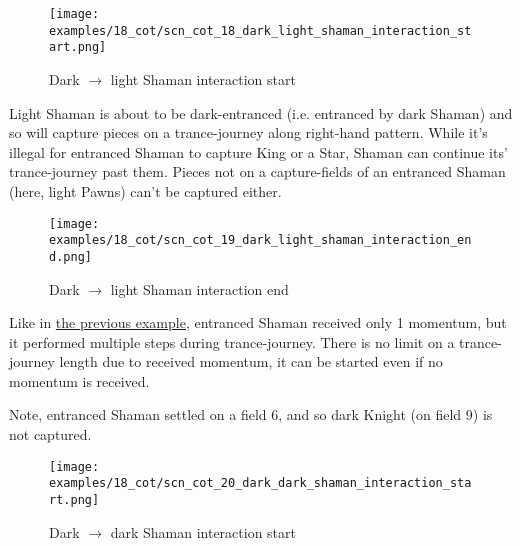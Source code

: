 \clearpage %

\noindent
\begin{figure}[!h]
\texttt{[image: examples/18\_cot/scn\_cot\_18\_dark\_light\_shaman\_interaction\_start.png]}
\caption{Dark $\rightarrow$ light Shaman interaction start}
\label{fig:scn_cot_18_dark_light_shaman_interaction_start}
\end{figure}

Light Shaman is about to be dark-entranced (i.e. entranced by dark Shaman) and so will capture
pieces on a trance-journey along right-hand pattern. While it's illegal for entranced Shaman
to capture King or a Star, Shaman can continue its' trance-journey past them. Pieces not on
a capture-fields of an entranced Shaman (here, light Pawns) can't be captured either.

\clearpage %

\noindent
\begin{figure}[!h]
\texttt{[image: examples/18\_cot/scn\_cot\_19\_dark\_light\_shaman\_interaction\_end.png]}
\caption{Dark $\rightarrow$ light Shaman interaction end}
\label{fig:scn_cot_19_dark_light_shaman_interaction_end}
\end{figure}

Like in \hyperref[fig:scn_cot_16_light_light_shaman_interaction_start]{the previous example},
entranced Shaman received only 1 momentum, but it performed multiple steps during trance-journey.
There is no limit on a trance-journey length due to received momentum, it can be started even if
no momentum is received.

Note, entranced Shaman settled on a field 6, and so dark Knight (on field 9) is not captured.

\clearpage %

\noindent
\begin{figure}[!h]
\texttt{[image: examples/18\_cot/scn\_cot\_20\_dark\_dark\_shaman\_interaction\_start.png]}
\caption{Dark $\rightarrow$ dark Shaman interaction start}
\label{fig:scn_cot_20_dark_dark_shaman_interaction_start}
\end{figure}

